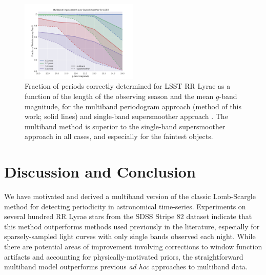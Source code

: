 \documentclass{emulateapj}
\newcommand{\todo}[1]{{\color{red} [TODO: #1]}}
\newcommand{\foreign}[1]{{\it #1}}
\newcommand{\adhoc}{\foreign{ad hoc}}
\newcommand{\figlabel}[1]{\label{fig:#1}}
\newcommand{\sectlabel}[1]{\label{sect:#1}}
\newcommand{\new}[1]{{\color{red} #1}}
\begin{document}




\begin{figure}
  \centering
  \includegraphics[width=0.5\textwidth]{fig09.pdf}
  \caption{
    Fraction of periods correctly determined for LSST RR Lyrae as a function
    of the length of the observing season and the mean $g$-band magnitude, for the multiband periodogram approach \new{(method of this work; solid lines)}
    and single-band supersmoother approach \new{\citep[method of][dashed lines]{Oluseyi12}}.
    The multiband method is superior to the single-band supersmoother approach in all cases, and especially for the faintest objects.
  } 
  \figlabel{LSST_sims}
\end{figure}

\section{Discussion and Conclusion}
\sectlabel{discussion}

We have motivated and derived a multiband version of the classic Lomb-Scargle method for detecting periodicity in astronomical time-series.
Experiments on several hundred RR Lyrae stars from the SDSS Stripe 82 dataset indicate that this method outperforms methods used previously in the literature, especially for sparsely-sampled light curves with only single bands observed each night.
While there are potential areas of improvement involving corrections to window function artifacts and accounting for physically-motivated priors, the straightforward multiband model outperforms previous \adhoc{} approaches to multiband data.
\end{document}
